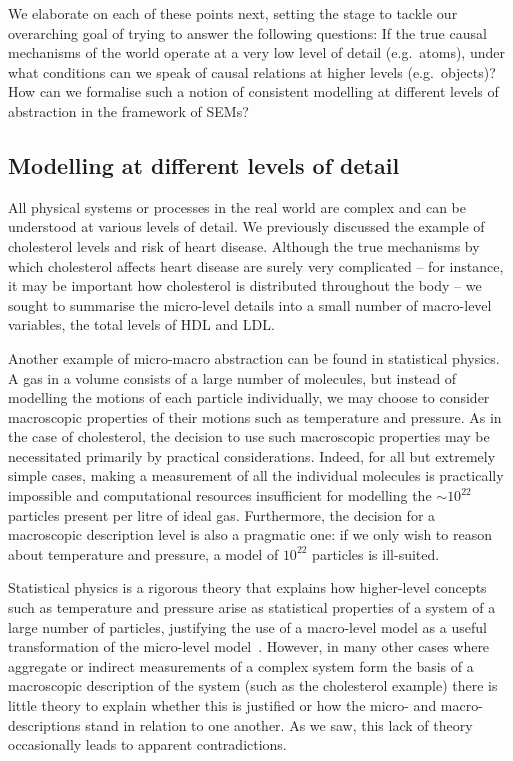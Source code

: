 We elaborate on each of these points next, 
setting the stage to tackle our overarching goal of trying to answer the following questions:
If the true causal mechanisms of the world operate at a very low level of detail (e.g.~atoms), under what conditions can we speak of causal relations at higher levels (e.g.~objects)?
How can we formalise such a notion of consistent modelling at different levels of abstraction in the framework of SEMs?


\subsection{Modelling at different levels of detail}\label{subsec:causality-modelling-different-levels}

All physical systems or processes in the real world are complex and can be understood at various levels of detail.
We previously discussed the example of cholesterol levels and risk of heart disease.
Although the true mechanisms by which cholesterol affects heart disease are surely very complicated -- for instance, it may be important how cholesterol is distributed throughout the body -- we sought to summarise the micro-level details into a small number of macro-level variables, the total levels of HDL and LDL.

Another example of micro-macro abstraction 
can be found in statistical physics.
A gas in a volume consists of a large number of molecules, but instead of modelling the motions of each particle individually, we may choose to consider macroscopic properties of their motions such as temperature and pressure.
As in the case of cholesterol, the decision to use such macroscopic properties may be necessitated primarily by practical considerations.
Indeed, for all but extremely simple cases, making a measurement of all the individual molecules is practically impossible and computational resources insufficient for modelling the ${\sim}10^{22}$ particles present per litre of ideal gas.
Furthermore, the decision for a macroscopic description level is also a pragmatic one: if we only wish to reason about temperature and pressure, a model of $10^{22}$ particles is ill-suited.

Statistical physics is a rigorous theory that explains how higher-level concepts such as temperature and pressure arise as statistical properties of a system of a large number of particles, justifying the use of a macro-level model as a useful transformation of the micro-level model~\citep{Balian}.
However, in many other cases where aggregate or indirect measurements of a complex system form the basis of a macroscopic description of the system (such as the cholesterol example) there is little theory to explain whether this is justified or how the micro- and macro-descriptions stand in relation to one another.
As we saw, this lack of theory occasionally leads to apparent contradictions.

